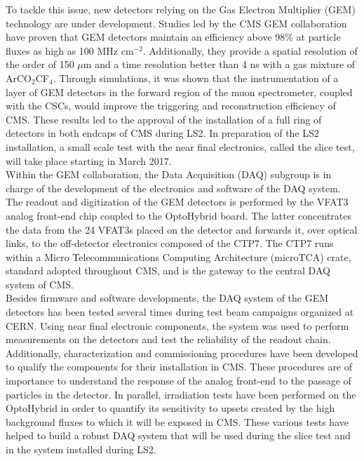   To tackle this issue, new detectors relying on the Gas Electron Multiplier (GEM) technology are under development. Studies led by the CMS GEM collaboration have proven that GEM detectors maintain an efficiency above 98\% at particle fluxes as high as 100 MHz cm$^{-2}$. Additionally, they provide a spatial resolution of the order of 150 $\mu$m and a time resolution better than 4 ns with a gas mixture of ArCO$_2$CF$_4$. Through simulations, it was shown that the instrumentation of a layer of GEM detectors in the forward region of the muon spectrometer, coupled with the CSCs, would improve the triggering and reconstruction efficiency of CMS. These results led to the approval of the installation of a full ring of detectors in both endcaps of CMS during LS2. In preparation of the LS2 installation, a small scale test with the near final electronics, called the slice test, will take place starting in March 2017. \\

  Within the GEM collaboration, the Data Acquisition (DAQ) subgroup is in charge of the development of the electronics and software of the DAQ system. The readout and digitization of the GEM detectors is performed by the VFAT3 analog front-end chip coupled to the OptoHybrid board. The latter concentrates the data from the 24 VFAT3s placed on the detector and forwards it, over optical links, to the off-detector electronics composed of the CTP7. The CTP7 runs within a Micro Telecommunications Computing Architecture (microTCA) crate, standard adopted throughout CMS, and is the gateway to the central DAQ system of CMS. \\

  Besides firmware and software developments, the DAQ system of the GEM detectors has been tested several times during test beam campaigns organized at CERN. Using near final electronic components, the system was used to perform measurements on the detectors and test the reliability of the readout chain. Additionally, characterization and commissioning procedures have been developed to qualify the components for their installation in CMS. These procedures are of importance to understand the response of the analog front-end to the passage of particles in the detector. In parallel, irradiation tests have been performed on the OptoHybrid in order to quantify its sensitivity to upsets created by the high background fluxes to which it will be exposed in CMS. These various tests have helped to build a robust DAQ system that will be used during the slice test and in the system installed during LS2. \\

